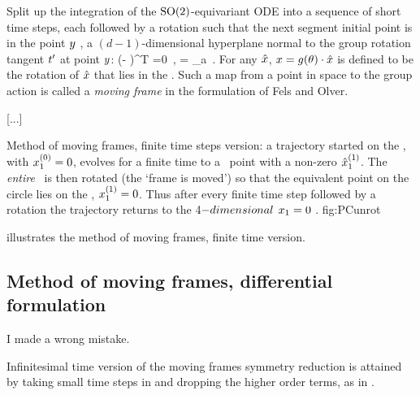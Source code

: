 {Split up the integration of the $\textrm{SO}(2)$-equivariant ODE into
a sequence of short time steps, each followed by a rotation
such that the next segment initial point is in the point
$y$ {\slice}, a $(d\!-\!1)$-dimensional hyperplane
normal to the group rotation tangent $t'_{}$ at point
$y$:
\beq
(\ssp - \sspRed)^T =0
    \,,\qquad
{} = \Lg_a \sspRed
\,.
For any $\hat{x}$, $x =
g({\bf \theta})\cdot\hat{x}$ is defined to be the
rotation of $\hat{x}$ that lies in the \slice. Such a
map from a point in space to the group action is called a
\emph{moving frame} in the formulation of Fels and
Olver.

[...]

{}{
Method of moving frames, finite time steps version: a
trajectory started on the \slice, with $x_1^{(0)}
=0$, evolves for a finite time to a \statesp\ point with a
non-zero $\hat{x}_1^{(1)}$. The {\em entire} \statesp\ is then
rotated (the `frame is moved') so that the equivalent point
on the circle lies on the \slice, $x_1^{(1)} =0$.
Thus after every finite time step followed by a rotation the
trajectory returns to the 4$-dimensional$ $x_1 =0$
\reducedsp.
}
{fig:PCunrot}

 illustrates the method of moving frames,
finite time version.

\subsection{Method of moving frames, differential formulation}
\label{sect:MovFrameODE}


\begin{bartlett}
I made a wrong mistake.
\end{bartlett}


Infinitesimal time version of the moving frames symmetry
reduction is attained by taking small time steps in
 and dropping the higher order terms, as
in .

}

